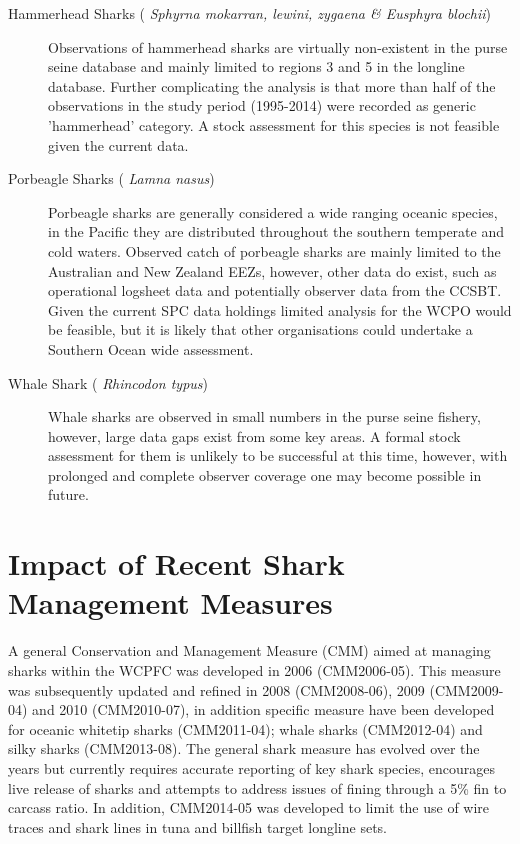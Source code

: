 \documentclass[12pt]{SCreport}
\begin{document}
\begin{description}
\item[ Hammerhead Sharks (\emph{ Sphyrna mokarran, lewini, zygaena \& Eusphyra blochii}) ]  Observations of hammerhead sharks are virtually non-existent in the purse seine database and mainly limited to regions 3 and 5 in the longline database. Further complicating the analysis is that more than half of the observations in the study period (1995-2014) were recorded as generic 'hammerhead' category. A stock assessment for this species is not feasible given the current data. 

\item[ Porbeagle Sharks (\emph{ Lamna nasus}) ] Porbeagle sharks are generally considered a wide ranging oceanic species, in the Pacific they are distributed throughout the southern temperate and cold waters. Observed catch of porbeagle sharks are mainly limited to the Australian and New Zealand EEZs, however, other data do exist, such as operational logsheet data and potentially observer data from the CCSBT. Given the current SPC data holdings limited analysis for the WCPO would be feasible, but it is likely that other organisations could undertake a Southern Ocean wide assessment.

\item[ Whale Shark (\emph{ Rhincodon typus}) ] Whale sharks are observed in small numbers in the purse seine fishery, however, large data gaps exist from some key areas. A formal stock assessment for them is unlikely to be successful at this time, however, with prolonged and complete observer coverage one may become possible in future. 


\end{description}

\section{Impact of Recent Shark Management Measures}

A general Conservation and Management Measure (CMM) aimed at managing sharks within the WCPFC was developed in 2006 (CMM2006-05). This measure was subsequently updated and refined in 2008 (CMM2008-06), 2009 (CMM2009-04) and 2010 (CMM2010-07), in addition specific measure have been developed for oceanic whitetip sharks (CMM2011-04); whale sharks (CMM2012-04) and silky sharks (CMM2013-08). The general shark measure has evolved over the years but currently requires accurate reporting of key shark species, encourages live release of sharks and attempts to address issues of fining through a 5\% fin to carcass ratio. In addition, CMM2014-05 was developed to limit the use of wire traces and shark lines in tuna and billfish target longline sets.
\end{document}
